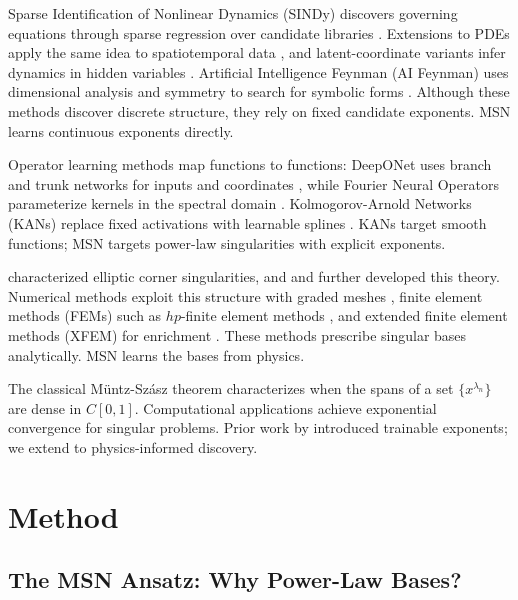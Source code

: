 \documentclass{article}
\theoremstyle{plain}
\theoremstyle{definition}
\theoremstyle{remark}
\begin{document}
Sparse Identification of Nonlinear Dynamics (SINDy) discovers governing equations through sparse regression over candidate libraries \cite{brunton2016discovering}. Extensions to PDEs apply the same idea to spatiotemporal data \cite{rudy2017data}, and latent-coordinate variants infer dynamics in hidden variables \cite{champion2019data}. Artificial Intelligence Feynman (AI Feynman) uses dimensional analysis and symmetry to search for symbolic forms \cite{udrescu2020ai}. Although these methods discover discrete structure, they rely on fixed candidate exponents. MSN learns continuous exponents directly.

Operator learning methods map functions to functions: DeepONet uses branch and trunk networks for inputs and coordinates \cite{lu2021learning}, while Fourier Neural Operators parameterize kernels in the spectral domain \cite{li2021fourier}. Kolmogorov-Arnold Networks (KANs) replace fixed activations with learnable splines \cite{liu2024kan,liu2025kan}. KANs target smooth functions; MSN targets power-law singularities with explicit exponents.

\citet{kondrat1967boundary} characterized elliptic corner singularities, and \citet{grisvard1985elliptic} and \citet{dauge1988elliptic} further developed this theory. Numerical methods exploit this structure with graded meshes \cite{babuska1979direct}, finite element methods (FEMs) such as $hp$-finite element methods \cite{schwab1998p}, and extended finite element methods (XFEM) for enrichment \cite{moes1999finite,babuska1997partition}. These methods prescribe singular bases analytically. MSN learns the bases from physics.

The classical M\"untz-Sz\'asz theorem \cite{muntz1914,borwein1995polynomials} characterizes when the spans of a set $\{x^{\lambda_n}\}$ are dense in $C[0,1]$. Computational applications \cite{shen2016muntz} achieve exponential convergence for singular problems. Prior work by \citet{nguessan2025msn} introduced trainable exponents; we extend to physics-informed discovery.

\section{Method}
\label{sec:method}

\subsection{The MSN Ansatz: Why Power-Law Bases?}
\end{document}
